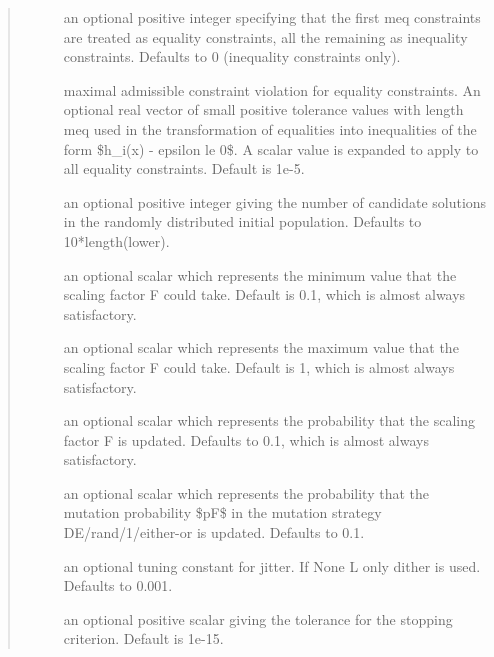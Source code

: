 \documentclass[letterpaper,10pt,english]{sphinxmanual}
\begin{document}
\begin{fulllineitems}
\begin{quote}
\begin{description}
\begin{description}
\item[{}] \leavevmode
an optional positive integer specifying that the first meq constraints
are treated as equality constraints, all the remaining as inequality
constraints. Defaults to 0 (inequality constraints only).

\item[{}] \leavevmode
maximal admissible constraint violation for equality constraints. An
optional real vector of small positive tolerance values with length meq
used in the transformation of equalities into inequalities of the form
\$\textbar{}h\_i(x)\textbar{} - epsilon le 0\$. A scalar value is expanded to apply to all
equality constraints. Default is 1e-5.

\item[{}] \leavevmode
an optional positive integer giving the number of candidate solutions in
the randomly distributed initial population. Defaults to
10*length(lower).

\item[{}] \leavevmode
an optional scalar which represents the minimum value that the scaling
factor F could take. Default is 0.1, which is almost always satisfactory.

\item[{}] \leavevmode
an optional scalar which represents the maximum value that the scaling
factor F could take. Default is 1, which is almost always satisfactory.

\item[{}] \leavevmode
an optional scalar which represents the probability that the scaling
factor F is updated. Defaults to 0.1, which is almost always
satisfactory.

\item[{}] \leavevmode
an optional scalar which represents the probability that the mutation
probability \$pF\$ in the mutation strategy DE/rand/1/either-or is updated.
Defaults to 0.1.

\item[{}] \leavevmode
an optional tuning constant for jitter. If None L only dither is used.
Defaults to 0.001.

\item[{}] \leavevmode
an optional positive scalar giving the tolerance for the stopping
criterion. Default is 1e-15.


\end{description}
\end{description}
\end{quote}
\end{fulllineitems}
\end{document}
